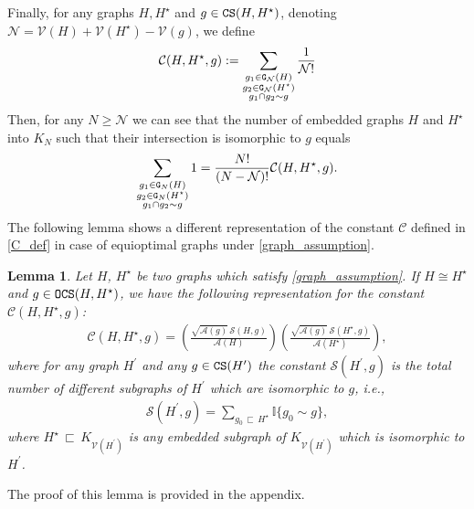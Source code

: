 \documentclass[11pt,reqno]{amsart}
\numberwithin{equation}{section}
\newtheorem{lem}[theo]{Lemma}
\begin{document}
\begin{itemize}
{\item[$\circ$]
Finally, for any graphs ${H},{H^{\star}}$ and $g\in{\tt CS}({H},{H^{\star}})$,  denoting $\mathcal{N}=\mathcal{V}({H})+\mathcal{V}({H^{\star}}) - \mathcal{V}(g)$, we define
\begin{align}
    \mathcal{C}({H},{H^{\star}},g):=\sum_{\substack{g_1\in{\tt G}_{\mathcal{N}}({H})\\ g_2\in{\tt G}_{\mathcal{N}}({H^{\star}}) \\ g_1\cap g_2\sim g}}\frac{1}{\mathcal{N}!}\label{C_def}
\end{align}
Then, for any $N\geqslant \mathcal{N}$ we can see that the number of embedded graphs $H$ and ${H^{\star}}$ into $K_N$ such that their intersection is isomorphic to $g$ equals
\begin{align*}
    \sum_{\substack{g_1\in{\tt G}_{N}({H})\\ g_2\in{\tt G}_{N}({H^{\star}}) \\ g_1\cap g_2\sim g}}1 = \frac{N!}{(N-\mathcal{N})!}\mathcal{C}({H},{H}^{\star},g).
\end{align*}
The following lemma shows a different representation of the constant $\mathcal{C}$ defined in \eqref{C_def} in case of equioptimal graphs under {\eqref{graph_assumption}}.
\begin{lem}\label{lem:constant_formula} 
    Let $H$, $H^{\star}$ be two graphs which satisfy {\eqref{graph_assumption}}. If $H\cong H^{\star}$ and $g\in {\tt OCS}(H, H^{\star})$, we have the following representation for the constant $\mathcal{C}(H,H^{\star},g)$:
    \begin{align*} 
        \mathcal{C}(H, H^{\star}, g) =\left(\frac{\sqrt{\mathcal{A}(g)}\,\mathcal{S}(H,g)}{\mathcal{A}(H)}\right)\left(\frac{\sqrt{\mathcal{A}(g)}\,\mathcal{S}(H^{\star},g)}{\mathcal{A}(H^{\star})}\right),
    \end{align*}
    where for any graph $H^{\prime}$ and any $g\in{\tt CS}(H^{\prime})$ the constant $\mathcal{S}(H^{\prime},g)$ is the total number of different subgraphs of $H^{\prime}$ which are isomorphic to $g$, i.e., 
    \begin{align}
        \mathcal{S}(H^{\prime},g) = \sum_{g_0\,\sqsubset\, {H^{\star}}}\mathbb{I}\{g_0\sim g\},\label{S_cal_def}
    \end{align}
    {where $H^{\star}\,\sqsubset\, K_{\mathcal{V}(H^{\prime})}$ is any embedded subgraph of $K_{\mathcal{V}(H^{\prime})}$ which is isomorphic to $H^{\prime}$.}
\end{lem}

The proof of this lemma is provided in the appendix.}
\end{itemize}
\end{document}
